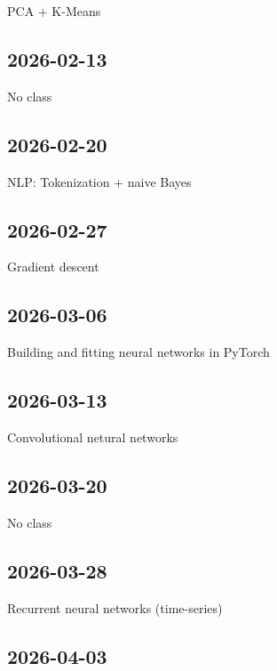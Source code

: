 \documentclass[11pt]{article}
\begin{document}
\begin{flushleft}
        PCA + K-Means

        \subsection{2026-02-13}
        \label{no-class-1}

        No class

        \subsection{2026-02-20}
        \label{section-4}

        NLP: Tokenization + naive Bayes

        \subsection{2026-02-27}
        \label{section-5}

        Gradient descent

        \subsection{2026-03-06}
        \label{section-6}

        Building and fitting neural networks in PyTorch

        \subsection{2026-03-13}
        \label{section-7}

        Convolutional netural networks

        \subsection{2026-03-20}
        \label{no-class-2}

        No class

        \subsection{2026-03-28}
        \label{section-8}

        Recurrent neural networks (time-series)

        \subsection{2026-04-03}
        \label{section-9}


\end{flushleft}
\end{document}
